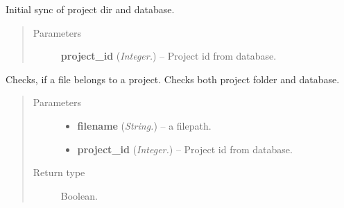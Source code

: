 \documentclass[letterpaper,10pt,english]{sphinxmanual}
\begin{document}

\begin{fulllineitems}
\label{api:controller.InitSyncProjectDir}
Initial sync of project dir and database.
\begin{quote}\begin{description}
\item[{Parameters}] \leavevmode
\textbf{project\_id} (\emph{Integer.}) -- Project id from database.

\end{description}\end{quote}

\end{fulllineitems}


\begin{fulllineitems}
\label{api:controller.IsProjectFile}
Checks, if a file belongs to a project. Checks both project folder and database.
\begin{quote}\begin{description}
\item[{Parameters}] \leavevmode\begin{itemize}
\item {} 
\textbf{filename} (\emph{String.}) -- a filepath.

\item {} 
\textbf{project\_id} (\emph{Integer.}) -- Project id from database.

\end{itemize}

\item[{Return type}] \leavevmode
Boolean.

\end{description}\end{quote}

\end{fulllineitems}

\end{document}
